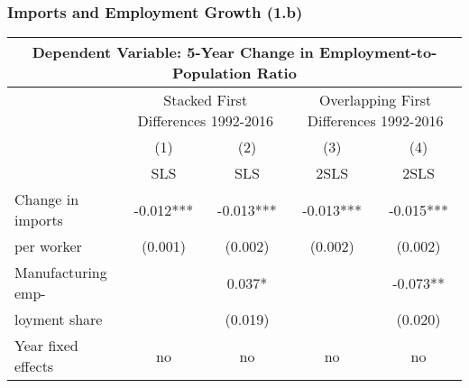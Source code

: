 \documentclass[11pt]{beamer}
\begin{document}
\begin{frame}
\frametitle{Imports and Employment Growth (1.b)}
\begin{table}
  \centering 
    {\tiny
    \begin{tabularx}{1\textwidth}{@{\extracolsep{\stretch{1}}} lcccc}
    \toprule
    \multicolumn{5}{c}{Dependent Variable: 5-Year Change in Employment-to-Population Ratio} \\
    \midrule
    & \multicolumn{2}{c}{Stacked First Differences 1992-2016}  & \multicolumn{2}{c}{Overlapping First Differences 1992-2016}\\
        \cmidrule{2-3} \cmidrule{4-5}
    & (1) & (2) & (3) & (4)  \\
    & SLS & SLS & 2SLS & 2SLS  \\
    \midrule
Change in imports & -0.012*** & -0.013*** & -0.013***  & -0.015*** \\
per worker	     &  (0.001) & (0.002) & (0.002) & (0.002)  \\
\midrule
Manufacturing emp- & & 0.037* & & -0.073** \\
loyment share & & (0.019) & & (0.020) \\
\midrule
 Year fixed effects & no & no & no & no  \\
 \bottomrule
    \end{tabularx}}
\end{table}
\end{frame}
\end{document}
